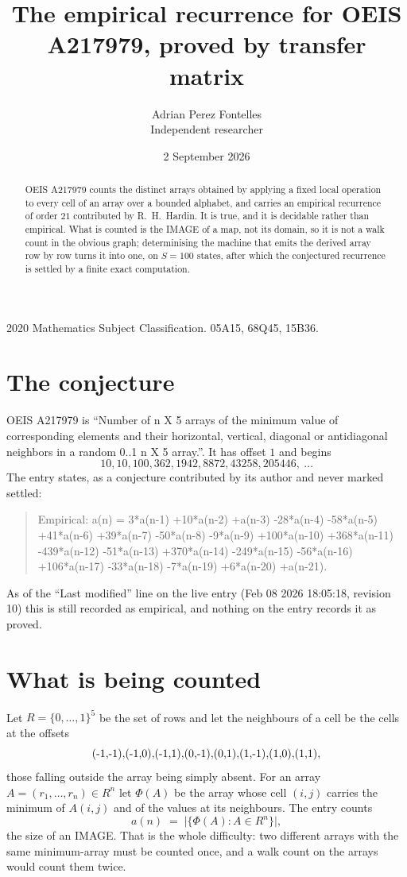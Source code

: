 \documentclass[11pt,a4paper]{article}
\title{The empirical recurrence for OEIS A217979, proved by transfer matrix}
\author{Adrian Perez Fontelles\\ \small Independent researcher}
\date{2 September 2026}
\theoremstyle{plain}
\theoremstyle{definition}
\begin{document}
\maketitle

\begin{abstract}
OEIS A217979 counts the distinct arrays obtained by applying a fixed local operation to every cell
of an array over a bounded alphabet, and carries an empirical recurrence of order $21$
contributed by R.~H.~Hardin. It is true, and it is decidable rather than empirical. What is
counted is the IMAGE of a map, not its domain, so it is not a walk count in the obvious graph;
determinising the machine that emits the derived array row by row turns it into one, on
$S=100$ states, after which the conjectured recurrence is settled by a finite exact
computation.
\end{abstract}

\noindent\small 2020 Mathematics Subject Classification. 05A15, 68Q45, 15B36.\normalsize

\section{The conjecture}

OEIS A217979 is ``Number of n X 5 arrays of the minimum value of corresponding elements and their horizontal, vertical, diagonal or antidiagonal neighbors in a random 0..1 n X 5 array.''. It has offset $1$ and begins
\[
10, 10, 100, 362, 1942, 8872, 43258, 205446,\ \dots
\]
The entry states, as a conjecture contributed by its author and never marked settled:
\begin{quote}
Empirical: a(n) = 3*a(n-1) +10*a(n-2) +a(n-3) -28*a(n-4) -58*a(n-5) +41*a(n-6) +39*a(n-7) -50*a(n-8) -9*a(n-9) +100*a(n-10) +368*a(n-11) -439*a(n-12) -51*a(n-13) +370*a(n-14) -249*a(n-15) -56*a(n-16) +106*a(n-17) -33*a(n-18) -7*a(n-19) +6*a(n-20) +a(n-21).
\end{quote}
As of the ``Last modified'' line on the live entry (Feb 08 2026 18:05:18, revision 10) this is still
recorded as empirical, and nothing on the entry records it as proved.

\section{What is being counted}

Let $R=\{0,\dots,1\}^{5}$ be the set of rows and let the neighbours of
a cell be the cells at the offsets
\[
$(-1,-1)$, $(-1,0)$, $(-1,1)$, $(0,-1)$, $(0,1)$, $(1,-1)$, $(1,0)$, $(1,1)$,
\]
those falling outside the array being simply absent. For an array
$A=(r_1,\dots,r_n)\in R^n$ let $\Phi(A)$ be the array whose cell $(i,j)$ carries the
minimum of $A(i,j)$ and of the values at its neighbours. The entry counts
\[
a(n)\;=\;\bigl|\{\Phi(A):A\in R^n\}\bigr| ,
\]
the size of an IMAGE. That is the whole difficulty: two different arrays with the same
minimum-array must be counted once, and a walk count on the arrays would count them twice.
\end{document}
